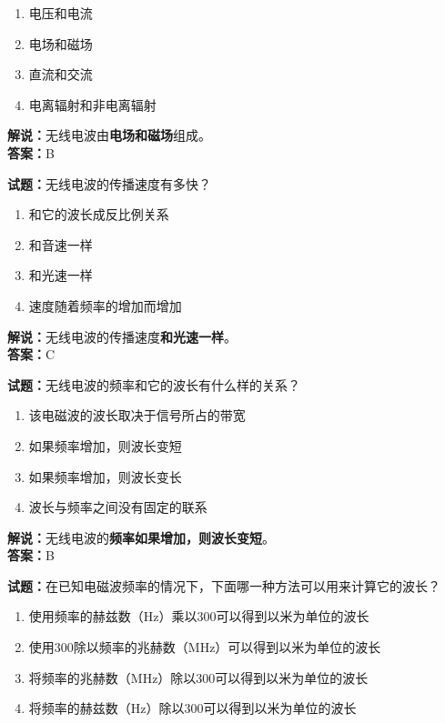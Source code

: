 \documentclass{ctexbook}
\begin{document}
\begin{enumerate}[leftmargin=3em]
  \item 电压和电流
  \item 电场和磁场
  \item 直流和交流
  \item 电离辐射和非电离辐射
\end{enumerate}

\noindent\textbf{解说：}无线电波由\textbf{电场和磁场}组成。\\\noindent\textbf{答案：}B

\bigskip

\noindent\textbf{试题：}无线电波的传播速度有多快？

\begin{enumerate}[leftmargin=3em]
  \item 和它的波长成反比例关系
  \item 和音速一样
  \item 和光速一样
  \item 速度随着频率的增加而增加
\end{enumerate}

\noindent\textbf{解说：}无线电波的传播速度\textbf{和光速一样}。\\\noindent\textbf{答案：}C

\bigskip

\noindent\textbf{试题：}无线电波的频率和它的波长有什么样的关系？

\begin{enumerate}[leftmargin=3em]
  \item 该电磁波的波长取决于信号所占的带宽
  \item 如果频率增加，则波长变短
  \item 如果频率增加，则波长变长
  \item 波长与频率之间没有固定的联系
\end{enumerate}

\noindent\textbf{解说：}无线电波的\textbf{频率如果增加，则波长变短}。\\\noindent\textbf{答案：}B

\bigskip

\noindent\textbf{试题：}在已知电磁波频率的情况下，下面哪一种方法可以用来计算它的波长？

\begin{enumerate}[leftmargin=3em]
  \item 使用频率的赫兹数（Hz）乘以300可以得到以米为单位的波长
  \item 使用300除以频率的兆赫数（\si{\MHz}）可以得到以米为单位的波长
  \item 将频率的兆赫数（\si{\MHz}）除以300可以得到以米为单位的波长
  \item 将频率的赫兹数（Hz）除以300可以得到以米为单位的波长
\end{enumerate}
\end{document}
